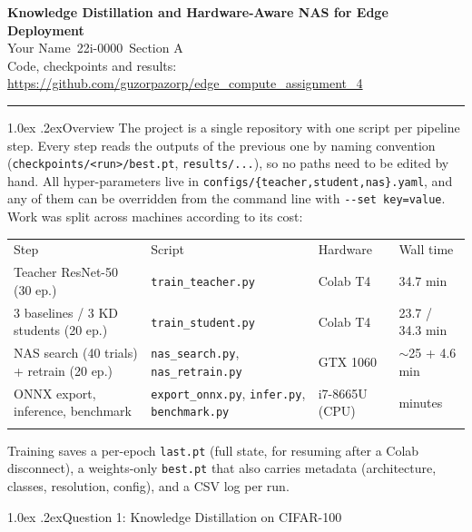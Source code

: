\documentclass[10pt,a4paper]{article}
\makeatletter
\newcommand{\studentname}{Your Name}
\newcommand{\rollno}{22i-0000}
\newcommand{\sectionid}{A}
\renewcommand\section{\@startsection{section}{1}{\z@}{-2.2ex \@plus -1ex \@minus -.2ex}%
  {1.0ex \@plus .2ex}{\normalfont\large\bfseries}}
\newcommand{\toprule}{\noalign{\hrule height 0.8pt}}
\newcommand{\midrule}{\noalign{\hrule height 0.4pt}}
\newcommand{\bottomrule}{\noalign{\hrule height 0.8pt}}
\newcommand{\code}[1]{\texttt{\small #1}}
\makeatother
\begin{document}
\begin{center}
  {\LARGE\bfseries Knowledge Distillation and Hardware-Aware NAS for Edge Deployment}\\[4pt]
  {\large \studentname\ \quad \rollno\ \quad Section \sectionid}\\[2pt]
  {\small Code, checkpoints and results: \url{https://github.com/guzorpazorp/edge_compute_assignment_4}}
\end{center}
\vspace{-4pt}
\noindent\textcolor{accent}{\rule{\linewidth}{0.8pt}}

\section{Overview}
The project is a single repository with one script per pipeline step. Every step reads the outputs
of the previous one by naming convention (\code{checkpoints/<run>/best.pt},
\code{results/...}), so no paths need to be edited by hand. All hyper-parameters live in
\code{configs/\{teacher,student,nas\}.yaml}, and any of them can be overridden from the command line with
\code{-{}-set key=value}. Work was split across machines according to its cost:

\begin{center}\small\setlength{\tabcolsep}{3.5pt}
\begin{tabular}{llll}
\toprule
Step & Script & Hardware & Wall time \\
\midrule
Teacher ResNet-50 (30 ep.) & \code{train\_teacher.py} & Colab T4 & 34.7 min \\
3 baselines / 3 KD students (20 ep.) & \code{train\_student.py} & Colab T4 & 23.7 / 34.3 min \\
NAS search (40 trials) + retrain (20 ep.) & \code{nas\_search.py}, \code{nas\_retrain.py} & GTX 1060 & $\sim$25 + 4.6 min \\
ONNX export, inference, benchmark & \code{export\_onnx.py}, \code{infer.py}, \code{benchmark.py} & i7-8665U (CPU) & minutes \\
\bottomrule
\end{tabular}
\end{center}
Training saves a per-epoch \code{last.pt} (full state, for resuming after a Colab disconnect), a
weights-only \code{best.pt} that also carries metadata (architecture, classes, resolution, config),
and a CSV log per run.

\section{Question 1: Knowledge Distillation on CIFAR-100}
\end{document}
